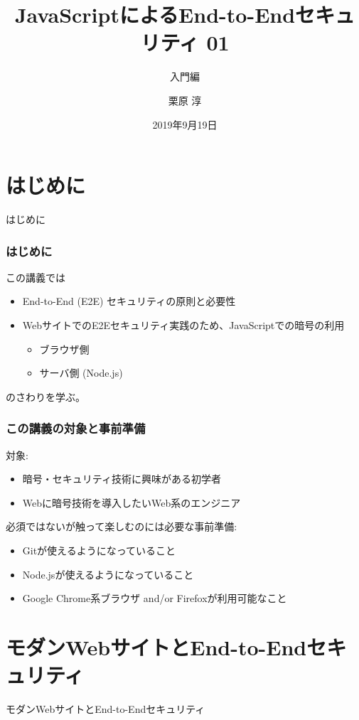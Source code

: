 \documentclass[12pt,dvipdfmx]{beamer}
\title[E2E Security with JS 01]{JavaScriptによるEnd-to-Endセキュリティ 01}
\subtitle{入門編}
\author[Jun Kurihara]{栗原 淳}
\institute[]{}
\date[Sept. 19, 2019]{2019年9月19日}
\begin{document}
\begin{frame}
\titlepage
\end{frame}

\section{はじめに}
\begin{frame}
 \centering
 {\Large はじめに}
\end{frame}

\begin{frame}
\frametitle{はじめに}
この講義では
\begin{itemize}
 \item End-to-End (E2E) セキュリティの原則と必要性
 \item WebサイトでのE2Eセキュリティ実践のため、JavaScriptでの暗号の利用
\begin{itemize}
 \item ブラウザ側
 \item サーバ側 (Node.js)
\end{itemize}
\end{itemize}
のさわりを学ぶ。
\end{frame}

\begin{frame}
\frametitle{この講義の対象と事前準備}
対象:
\begin{itemize}
\item 暗号・セキュリティ技術に興味がある初学者
\item Webに暗号技術を導入したいWeb系のエンジニア
\end{itemize}

\vspace{2ex}

必須ではないが触って楽しむのには必要な事前準備:
\begin{itemize}
\item Gitが使えるようになっていること
\item Node.jsが使えるようになっていること
\item Google Chrome系ブラウザ and/or Firefoxが利用可能なこと
\end{itemize}
\end{frame}


\section{モダンWebサイトとEnd-to-Endセキュリティ}
\begin{frame}
 \centering
 {\Large モダンWebサイトとEnd-to-Endセキュリティ}
\end{frame}
\end{document}
